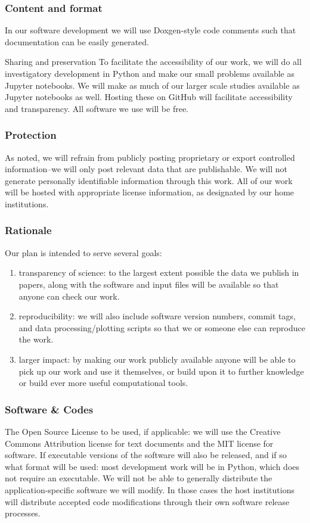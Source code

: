 \documentclass[12pt]{article}
\begin{document}
\subsubsection*{Content and format}
In our software development we will use Doxgen-style code comments such that documentation can be easily generated. 

Sharing and preservation
To facilitate the accessibility of our work, we will do all investigatory development in Python and make our small problems available as Jupyter notebooks. We will make as much of our larger scale studies available as Jupyter notebooks as well. Hosting these on GitHub will facilitate accessibility and transparency. All software we use will be free. 

\subsubsection*{Protection}
As noted, we will refrain from publicly posting proprietary or export controlled information--we will only post relevant data that are publishable. We will not generate personally identifiable information through this work. All of our work will be hosted with appropriate license information, as designated by our home institutions.
 
\subsubsection*{Rationale}
Our plan is intended to serve several goals:
\begin{enumerate}
\item  transparency of science: to the largest extent possible the data we publish in papers, along with the software and input files will be available so that anyone can check our work.
\item reproducibility: we will also include software version numbers, commit tags, and data processing/plotting scripts so that we or someone else can reproduce the work.
\item larger impact: by making our work publicly available anyone will be able to pick up our work and use it themselves, or build upon it to further knowledge or build ever more useful computational tools.
\end{enumerate}

\subsubsection*{Software \& Codes}
The Open Source License to be used, if applicable: we will use the Creative Commons Attribution license for text documents and the MIT license for software. 
If executable versions of the software will also be released, and if so what format will be used: most development work will be in Python, which does not require an executable. We will not be able to generally distribute the application-specific software we will modify. In those cases the host institutions will distribute accepted code modifications through their own software release processes.
\end{document}
